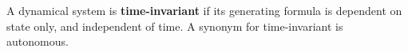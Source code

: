 \documentclass[12pt]{article}
\begin{document}
A dynamical system is {\bf time-invariant} if its generating formula is dependent on state only, and independent of time. A synonym for time-invariant is autonomous.
\end{document}
